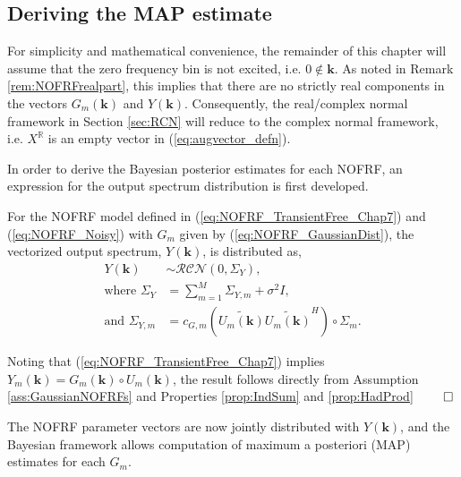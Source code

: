 \subsection{Deriving the MAP estimate}

\begin{assum}
For simplicity and mathematical convenience, the remainder of this chapter will assume that the zero frequency bin is not excited, i.e. $0 \notin \mathbf{k}$. As noted in Remark \ref{rem:NOFRFrealpart}, this implies that there are no strictly real components in the vectors $G_m(\mathbf{k})$ and $Y(\mathbf{k})$. Consequently, the real/complex normal framework in Section \ref{sec:RCN} will reduce to the complex normal framework, i.e. $X^{\mathbb{R}}$ is an empty vector in (\ref{eq:augvector_defn}). 
\label{ass:NOFRFs_NoReals}
\end{assum}

In order to derive the Bayesian posterior estimates for each NOFRF, an expression for the output spectrum distribution is first developed.
\begin{thm}%
For the NOFRF model defined in (\ref{eq:NOFRF_TransientFree_Chap7}) and (\ref{eq:NOFRF_Noisy}) with $G_m$ given by (\ref{eq:NOFRF_GaussianDist}), the vectorized output spectrum, $Y(\mathbf{k})$, is distributed as,
\begin{equation}
\begin{split}
\label{eq:OutputSpectrumThm}
Y(\mathbf{k}) &\sim \mathcal{RCN}(0,\Sigma_Y), \\
\text{where } \Sigma_Y &= \sum_{m=1}^{M} \Sigma_{Y,m} + \sigma^2 I, \\
\text{and } \Sigma_{Y,m} &= c_{G,m} (\widetilde{U_m(\mathbf{k})} \widetilde{U_m(\mathbf{k})}^H)  \circ \Sigma_m.
\end{split}
\end{equation}
\end{thm}
\begin{proof*}
Noting that (\ref{eq:NOFRF_TransientFree_Chap7}) implies $Y_m(\mathbf{k}) = G_m(\mathbf{k}) \circ U_m(\mathbf{k})$, the result follows directly from Assumption \ref{ass:GaussianNOFRFs} and Properties \ref{prop:IndSum} and \ref{prop:HadProd} \hfill $\qed$
\end{proof*}

The NOFRF parameter vectors are now jointly distributed with $Y(\mathbf{k})$, and the Bayesian framework allows computation of maximum a posteriori (MAP) estimates for each $G_m$.%

